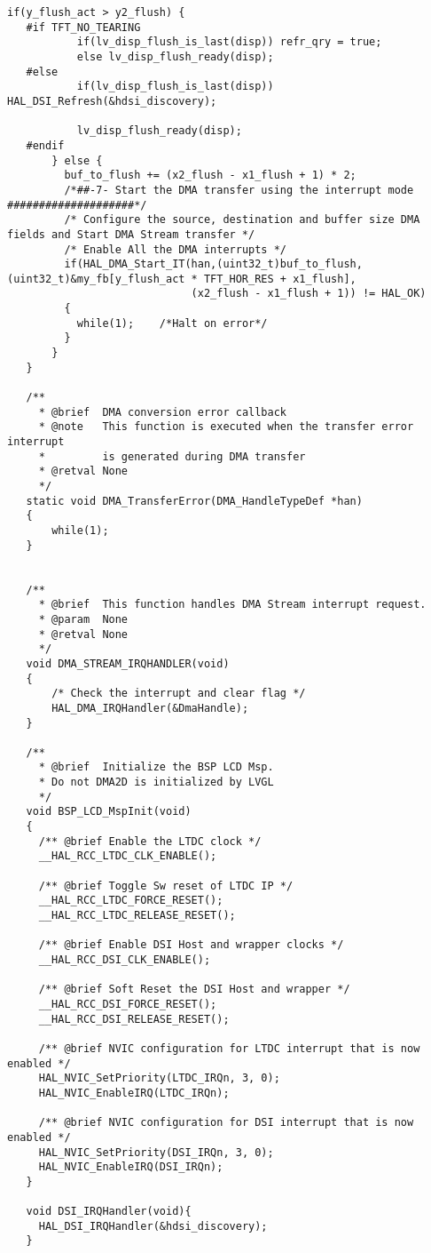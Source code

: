 \begin{lstlisting}[captionpos=t, caption={Fichero \texttt{tft.c}}]
       if(y_flush_act > y2_flush) {
   #if TFT_NO_TEARING
           if(lv_disp_flush_is_last(disp)) refr_qry = true;
           else lv_disp_flush_ready(disp);
   #else
           if(lv_disp_flush_is_last(disp)) HAL_DSI_Refresh(&hdsi_discovery);
   
           lv_disp_flush_ready(disp);
   #endif
       } else {
         buf_to_flush += (x2_flush - x1_flush + 1) * 2;
         /*##-7- Start the DMA transfer using the interrupt mode ####################*/
         /* Configure the source, destination and buffer size DMA fields and Start DMA Stream transfer */
         /* Enable All the DMA interrupts */
         if(HAL_DMA_Start_IT(han,(uint32_t)buf_to_flush, (uint32_t)&my_fb[y_flush_act * TFT_HOR_RES + x1_flush],
                             (x2_flush - x1_flush + 1)) != HAL_OK)
         {
           while(1);	/*Halt on error*/
         }
       }
   }
   
   /**
     * @brief  DMA conversion error callback
     * @note   This function is executed when the transfer error interrupt
     *         is generated during DMA transfer
     * @retval None
     */
   static void DMA_TransferError(DMA_HandleTypeDef *han)
   {
       while(1);
   }
   
   
   /**
     * @brief  This function handles DMA Stream interrupt request.
     * @param  None
     * @retval None
     */
   void DMA_STREAM_IRQHANDLER(void)
   {
       /* Check the interrupt and clear flag */
       HAL_DMA_IRQHandler(&DmaHandle);
   }
   
   /**
     * @brief  Initialize the BSP LCD Msp.
     * Do not DMA2D is initialized by LVGL
     */
   void BSP_LCD_MspInit(void)
   {
     /** @brief Enable the LTDC clock */
     __HAL_RCC_LTDC_CLK_ENABLE();
   
     /** @brief Toggle Sw reset of LTDC IP */
     __HAL_RCC_LTDC_FORCE_RESET();
     __HAL_RCC_LTDC_RELEASE_RESET();
   
     /** @brief Enable DSI Host and wrapper clocks */
     __HAL_RCC_DSI_CLK_ENABLE();
   
     /** @brief Soft Reset the DSI Host and wrapper */
     __HAL_RCC_DSI_FORCE_RESET();
     __HAL_RCC_DSI_RELEASE_RESET();
   
     /** @brief NVIC configuration for LTDC interrupt that is now enabled */
     HAL_NVIC_SetPriority(LTDC_IRQn, 3, 0);
     HAL_NVIC_EnableIRQ(LTDC_IRQn);
   
     /** @brief NVIC configuration for DSI interrupt that is now enabled */
     HAL_NVIC_SetPriority(DSI_IRQn, 3, 0);
     HAL_NVIC_EnableIRQ(DSI_IRQn);
   }
   
   void DSI_IRQHandler(void){
     HAL_DSI_IRQHandler(&hdsi_discovery);
   }   
\end{lstlisting}